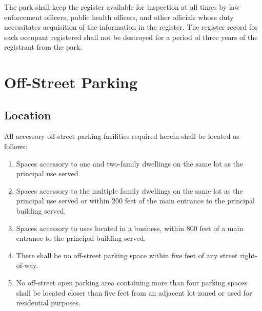 \subsubsection{}
The park shall keep the register available for inspection at all times by law enforcement officers, public health officers, and other officials whose duty necessitates acquisition of the information in the register. The register record for each occupant registered shall not be destroyed for a period of three years of the registrant from the park.

\section{Off-Street Parking}
\subsection{Location}
All accessory off-street parking facilities required herein shall be located as follows:
\begin{enumerate}[{\indent}1)]
    \item Spaces accessory to one and two-family dwellings on the same lot as the principal use served.
    \item Spaces accessory to the multiple family dwellings on the same lot as the principal use served or within 200 feet of the main entrance to the principal building served.
    \item Spaces accessory to uses located in a business, within 800 feet of a main entrance to the principal building served.
    \item There shall be no off-street parking space within five feet of any street right-of-way.
    \item No off-street open parking area containing more than four parking spaces shall be located closer than five feet from an adjacent lot zoned or used for residential purposes.
\end{enumerate}
